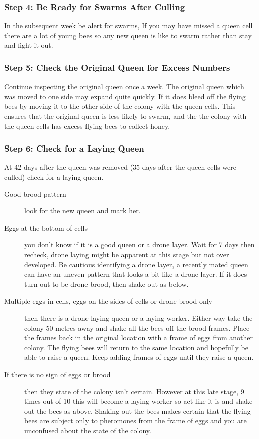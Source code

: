 \subsubsection*{Step 4: Be Ready for Swarms After Culling}

In the subsequent week be alert for swarms,
If you may have missed a queen cell there are a lot of young bees
so any new queen is like to swarm rather than stay and fight it out.

\subsubsection*{Step 5: Check the Original Queen for Excess Numbers}

Continue inspecting the original queen once a week.
The original queen which was moved to one side may expand quite quickly.
If it does bleed off the flying bees by moving it to the other side of the colony with the queen cells.
This ensures that the original queen is less likely to swarm,
and the the colony with the queen cells has excess flying bees to collect honey.

\subsubsection*{Step 6: Check for a Laying Queen}

At 42 days after the queen was removed
(35 days after the queen cells were culled)
check for a laying queen.

\begin{description}
  \item [Good brood pattern] look for the new queen and mark her.
  \item [Eggs at the bottom of cells] you don't know if it is a good queen or a drone layer.
    Wait for 7 days then recheck, drone laying might be apparent at this stage but not over developed.
    Be cautious identifying a drone layer, 
    a recently mated queen can have an uneven pattern that looks a bit like a drone layer.
    If it does turn out to be drone brood, then shake out as below.
  \item[Multiple eggs in cells, eggs on the sides of cells or drone brood only]
    then there is a drone laying queen or a laying worker.
    Either way take the colony 50 metres away and shake all the bees off the brood frames.
    Place the frames back in the original location with a frame of eggs from another colony.
    The flying bees will return to the same location and hopefully be able to raise a queen.
    Keep adding frames of eggs until they raise a queen.
  \item [If there is no sign of eggs or brood] then they state of the colony isn't certain.
    However at this late stage, 9 times out of 10 this will become a laying worker
    so act like it is and shake out the bees as above.
    Shaking out the bees makes certain that the flying bees are subject only to pheromones from the frame of eggs
    and you are unconfused about the state of the colony.
\end{description}
